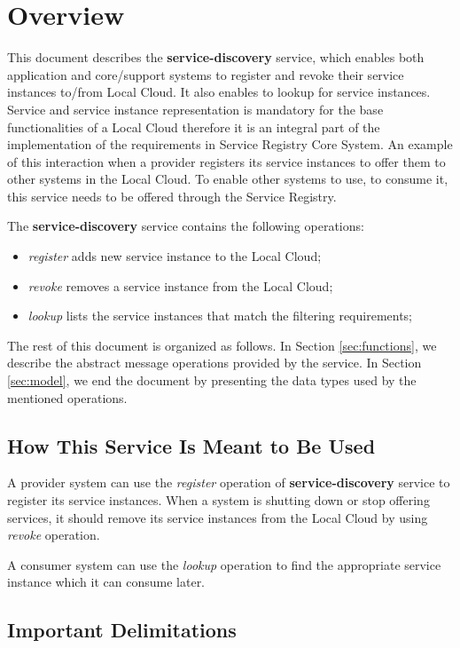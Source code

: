 \documentclass[a4paper]{arrowhead}
\begin{document}
\section{Overview}
\label{sec:overview}
This document describes the \textbf{service-discovery} service, which enables both application and core/support systems to register and revoke their service instances to/from Local Cloud. It also enables to lookup for service instances. Service and service instance representation is mandatory for the base functionalities of a Local Cloud therefore it is an integral part of the implementation of the requirements in Service Registry Core System. An example of this interaction when a provider registers its service instances to offer them to other systems in the Local Cloud. To enable other systems to use, to consume it, this service needs to be offered through the Service Registry.

The \textbf{service-discovery} service contains the following operations:

\begin{itemize}
    \item \textit{register} adds new service instance to the Local Cloud;
    \item \textit{revoke} removes a service instance from the Local Cloud;
    \item \textit{lookup} lists the service instances that match the filtering requirements;
\end{itemize}

The rest of this document is organized as follows.
In Section \ref{sec:functions}, we describe the abstract message operations provided by the service.
In Section \ref{sec:model}, we end the document by presenting the data types used by the mentioned operations.

\subsection{How This Service Is Meant to Be Used}
A provider system can use the \textit{register} operation of \textbf{service-discovery} service to register its service instances. When a system is shutting down or stop offering services, it should remove its service instances  from the Local Cloud by using \textit{revoke} operation.

A consumer system can use the \textit{lookup} operation to find the appropriate service instance which it can consume later.

\subsection{Important Delimitations}
\label{sec:delimitations}
\end{document}
